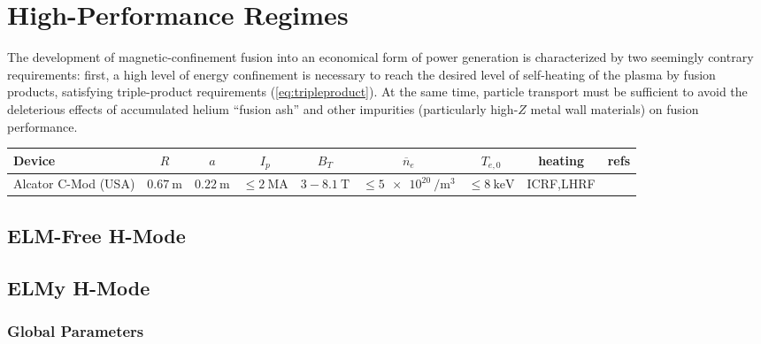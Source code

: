 \chapter{High-Performance Regimes}\label{ch:HighPerformance}

The development of magnetic-confinement fusion into an economical form of power generation is characterized by two seemingly contrary requirements: first, a high level of energy confinement is necessary to reach the desired level of self-heating of the plasma by fusion products, satisfying triple-product requirements (\cref{eq:tripleproduct}).  At the same time, particle transport must be sufficient to avoid the deleterious effects of accumulated helium ``fusion ash'' and other impurities (particularly high-$Z$ metal wall materials) on fusion performance.


\begin{table*}[h]
 \pushtooutside
 {\begin{tabular}{lcccccccc}
  \toprule
  Device &
  $R$ &
  $a$ &
  $I_p$ &
  $B_T$ &
  $\overline{n}_e$ &
  $T_{e,0}$ &
  heating &
  refs
  \\
  \midrule
  Alcator C-Mod (USA) &
  $\SI{0.67}{\meter}$ &
  $\SI{0.22}{\meter}$ &
  $\le \SI{2}{\mega\ampere}$ &
  $3-\SI{8.1}{\tesla}$ &
  $\le \SI{5e20}{\per\meter\cubed}$ &
  $\le \SI{8}{\kilo\electronvolt}$ &
  ICRF,LHRF &
  \cite{Hutchinson1994}
  \\
  \bottomrule
 \end{tabular}}
\end{table*}

\section{ELM-Free H-Mode}\label{sec:hcr_elmfree}

\nicesectionending

\section{ELMy H-Mode}\label{sec:hcr_elmy}

\subsection{Global Parameters}\label{subsec:hcr_elmy_ped}


